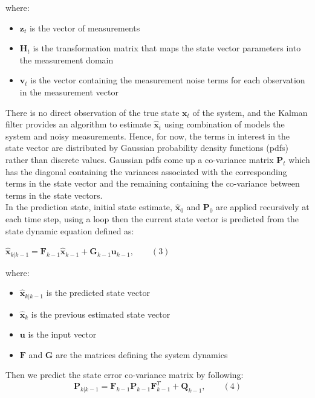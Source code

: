 where:
\begin{itemize}
    \item $\textbf{z}_t$ is the vector of measurements
    \item $\textbf{H}_t$ is the transformation matrix that maps the state vector parameters into the measurement domain
    \item $\textbf{v}_t$ is the vector containing the measurement noise terms for each observation in the measurement vector
\end{itemize}
There is no direct observation of the true state $\textbf{x}_t$ of the system, and the Kalman filter provides an algorithm to estimate $\hat{\textbf{x}}_t$ using combination of models the system and noisy measurements. Hence, for now, the terms in interest in the state vector are distributed by Gaussian probability density functions (pdfs) rather than discrete values. Gaussian pdfs come up a co-variance matrix $\textbf{P}_t$ which has the diagonal containing the variances associated with the corresponding terms in the state vector and the remaining containing the co-variance between terms in the state vectors.\\
In the prediction state, initial state estimate, $\hat{\textbf{x}}_0$ and $\textbf{P}_0$ are applied recursively at each time step, using a loop then the current state vector is predicted from the state dynamic equation defined as:
\begin{center}
    $
        \hat{\textbf{x}}_{k|k-1} = \textbf{F}_{k-1}\hat{\textbf{x}}_{k-1} + \textbf{G}_{k-1}\textbf{u}_{k-1}, \qquad (3)
    $
\end{center}
where:
\begin{itemize}
    \item $\hat{\textbf{x}}_{k|k-1}$ is the predicted state vector
    \item $\hat{\textbf{x}}_{k}$ is the previous estimated state vector
    \item $\textbf{u}$ is the input vector
    \item $\textbf{F}$ and $\textbf{G}$ are the matrices defining the system dynamics
\end{itemize}
\pagebreak
Then we predict the state error co-variance matrix by following:
\begin{displaymath}
          \textbf{P}_{k|k-1} = \textbf{F}_{k-1}\textbf{P}_{k-1}\textbf{F}^T_{k-1} + \textbf{Q}_{k-1}, \qquad (4)
\end{displaymath}

